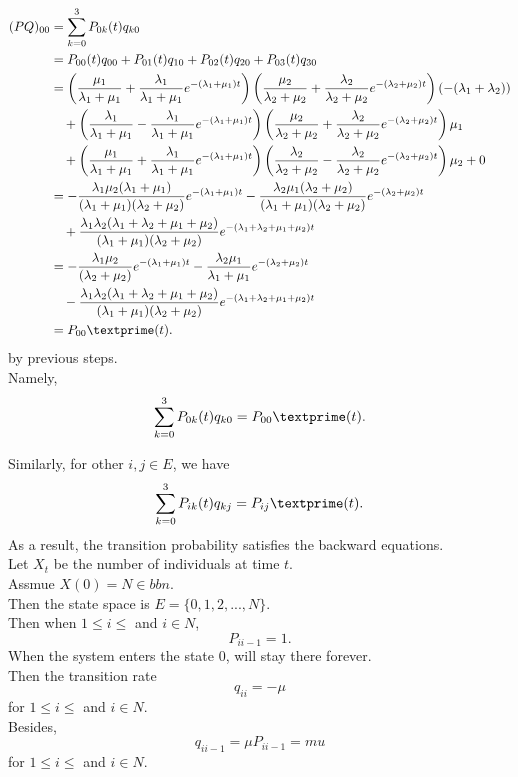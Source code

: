 \documentclass{amsart}
\theoremstyle{plain}
\theoremstyle{definition}
\begin{document}
\begin{align*}
  (PQ)_{00} &=\sum_{k=0}^{3}P_{0k}(t)q_{k0} \\
  			&= P_{00}(t)q_{00}+P_{01}(t)q_{10}+P_{02}(t)q_{20}+P_{03}(t)q_{30} \\
  			&=\left(\frac{\mu_1}{\lambda_1 + \mu_1} + \frac{\lambda_1}{\lambda_1 + \mu_1}e^{-(\lambda_1 + \mu_1)      t}\right)
  \left(\frac{\mu_2}{\lambda_2 + \mu_2} + \frac{\lambda_2}{\lambda_2+ \mu_2}e^{-(\lambda_2 + \mu_2)t}\right) \left(-(\lambda_1+\lambda_2)\right) \\
  			&\ \ \ +\left(\frac{\lambda_1}{\lambda_1 + \mu_1} - \frac{\lambda_1}{\lambda_1 + \mu_1}e^{-(\lambda_1 + \mu_1)t}\right) \left(\frac{\mu_2}{\lambda_2 + \mu_2} + \frac{\lambda_2}{\lambda_2 + \mu_2}e^{-(\lambda_2 + \mu_2)t}\right)\mu_1\\
  			&\ \ \ +\left(\frac{\mu_1}{\lambda_1 + \mu_1} + \frac{\lambda_1}{\lambda_1 + \mu_1}e^{-(\lambda_1 + \mu_1)      t} \right)\left(\frac{\lambda_2}{\lambda_2 + \mu_2} - \frac{\lambda_2}{\lambda_2 + \mu_2}e^{-(\lambda_2 + \mu_2)t}\right)\mu_2 + 0\\
			&=-\frac{\lambda_1\mu_2(\lambda_1+\mu_1)}{(\lambda_1+\mu_1)(\lambda_2+\mu_2)}e^{-(\lambda_1 + \mu_1)t} - \frac{\lambda_2\mu_1(\lambda_2+\mu_2)}{(\lambda_1+\mu_1)(\lambda_2+\mu_2)}e^{-(\lambda_2 + \mu_2)t} \\
  			&\ \ \ + \frac{\lambda_1\lambda_2(\lambda_1+\lambda_2 +\mu_1+ \mu_2)}{(\lambda_1+\mu_1)(\lambda_2+\mu_2)}e^{-(\lambda_1+\lambda_2+\mu_1+ \mu_2)t}\\
			&=-\frac{\lambda_1\mu_2}{(\lambda_2+\mu_2)}e^{-(\lambda_1 + \mu_1)t} - \frac{\lambda_2\mu_1}{\lambda_1+\mu_1}e^{-(\lambda_2 + \mu_      2)t} \\
            & \ \ \ - \frac{\lambda_1\lambda_2(\lambda_1+\lambda_2 +\mu_1+ \mu_2)}{(\lambda_1+\mu_1)(\lambda_2+\mu_2)}e^{-(\lambda_1+\lambda_2+\mu_1+ \mu_2)t}\\
  			&=P_{00}\textprime (t). 
\end{align*}
by previous steps.\\
Namely,
\[\sum_{k=0}^{3}P_{0k}(t)q_{k0} = P_{00}\textprime (t).\]

Similarly, for other $i,j \in E$, we have 
\[\sum_{k=0}^{3}P_{ik}(t)q_{kj} = P_{ij}\textprime (t).\]
As a result, the transition probability satisfies the backward equations.\\

\newpage
Let $X_{t}$ be the number of individuals at time $t$.\\
Assmue $X(0) = N \in bbn$.\\
Then the state space is $E=\{0,1,2,...,N\}$.\\
Then when $1 \leq i \leq $ and $i \in N$,
\[P_{ii-1} = 1.\]
When the system enters the state $0$, will stay there forever.\\
Then the transition rate
\[q_{ii} = -\mu\] 
for $1 \leq i \leq $ and $i \in N$.\\
Besides,
\[q_{ii-1} = \mu P_{ii-1} = mu\]
for $1 \leq i \leq $ and $i \in N$.\\
\end{document}

